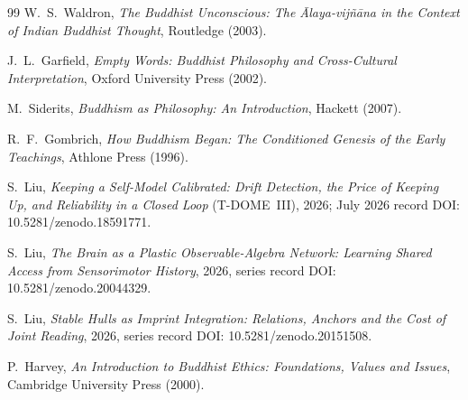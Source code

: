\documentclass[11pt,a4paper]{article}
\begin{document}
\begin{thebibliography}{99}
W.~S.~Waldron, \emph{The Buddhist Unconscious: The \=Alaya-vij\~n\=ana in the Context of Indian Buddhist Thought}, Routledge (2003).

J.~L.~Garfield, \emph{Empty Words: Buddhist Philosophy and Cross-Cultural Interpretation}, Oxford University Press (2002).

M.~Siderits, \emph{Buddhism as Philosophy: An Introduction}, Hackett (2007).

R.~F.~Gombrich, \emph{How Buddhism Began: The Conditioned Genesis of the Early Teachings}, Athlone Press (1996).

S.~Liu, \emph{Keeping a Self-Model Calibrated: Drift Detection, the Price of Keeping Up, and Reliability in a Closed Loop} (T-DOME~III), 2026; July 2026 record DOI: 10.5281/zenodo.18591771.

S.~Liu, \emph{The Brain as a Plastic Observable-Algebra Network:
Learning Shared Access from Sensorimotor History}, 2026, series record DOI: 10.5281/zenodo.20044329.

S.~Liu, \emph{Stable Hulls as Imprint Integration: Relations, Anchors
and the Cost of Joint Reading}, 2026,
series record DOI: 10.5281/zenodo.20151508.

P.~Harvey, \emph{An Introduction to Buddhist Ethics: Foundations, Values and Issues}, Cambridge University Press (2000).

\end{thebibliography}
\end{document}
